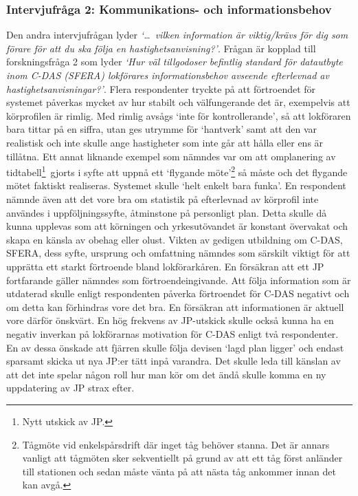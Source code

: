 \subsubsection{Intervjufråga 2: Kommunikations- och informationsbehov}
Den andra intervjufrågan lyder \emph{\lq{}\ldots~vilken information är viktig/krävs för dig som förare för att du ska följa en hastighetsanvisning?\rq{}}.
Frågan är kopplad till forskningsfråga 2 som lyder \emph{\lq{}Hur väl tillgodoser befintlig standard för datautbyte inom C-DAS (SFERA) lokförares informationsbehov avseende efterlevnad av hastighetsanvisningar?\rq{}}.
Flera respondenter tryckte på att förtroendet för systemet påverkas mycket av hur stabilt och välfungerande det är, exempelvis att körprofilen är rimlig.
Med rimlig avsågs \lq{}inte för kontrollerande\rq{}, så att lokföraren bara tittar på en siffra, utan ges utrymme för \lq{}hantverk\rq{} samt att den var realistisk och inte skulle ange hastigheter som inte går att hålla eller ens är tillåtna.
Ett annat liknande exempel som nämndes var om att omplanering av tidtabell\footnote{Nytt utskick av JP.}~gjorts i syfte att uppnå ett \lq{}flygande möte\rq{}\footnote{Tågmöte vid enkelspårsdrift där inget tåg behöver stanna. Det är annars vanligt att tågmöten sker sekventiellt på grund av att ett tåg först anländer till stationen och sedan måste vänta på att nästa tåg ankommer innan det kan avgå.} så måste och det flygande mötet faktiskt realiseras.
Systemet skulle \lq{}helt enkelt bara funka\rq{}.
En respondent nämnde även att det vore bra om statistik på efterlevnad av körprofil inte användes i uppföljningssyfte, åtminstone på personligt plan.
Detta skulle då kunna upplevas som att körningen och yrkesutövandet är konstant övervakat och skapa en känsla av obehag eller olust.
Vikten av gedigen utbildning om C-DAS, SFERA, dess syfte, ursprung och omfattning nämndes som särskilt viktigt för att upprätta ett starkt förtroende bland lokförarkåren.
En försäkran att ett JP fortfarande gäller nämndes som förtroendeingivande.
Att följa information som är utdaterad skulle enligt respondenten påverka förtroendet för C-DAS negativt och om detta kan förhindras vore det bra.
En försäkran att informationen är aktuell vore därför önskvärt.
En hög frekvens av JP-utskick skulle också kunna ha en negativ inverkan på lokförarnas motivation för C-DAS enligt två respondenter.
En av dessa önskade att fjärren skulle följa devisen \lq{}lagd plan ligger\rq{} och endast sparsamt skicka ut nya JP:er tätt inpå varandra.
Det skulle leda till känslan av att det inte spelar någon roll hur man kör om det ändå skulle komma en ny uppdatering av JP strax efter.
